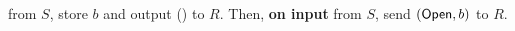 \begin{bbox}[title={Functionality $\F_{\m{com}}(S, R)$}]

\OnInput {} from $S$, store $b$ and output () to $R$. Then, {\bf on input}  from $S$, send $(\mathsf{Open}, b)$ to $R$.

\end{bbox}

